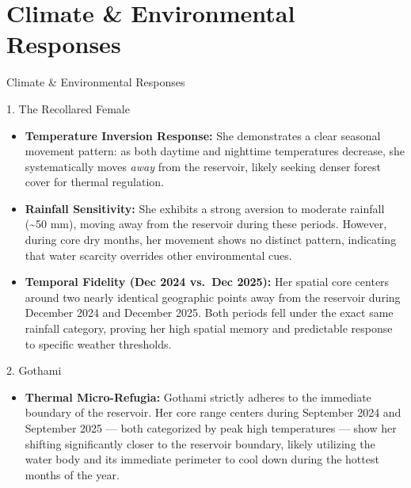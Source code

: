 \documentclass{beamer}
\begin{document}
	
	
	
	\section{Climate \& Environmental Responses}
	\begin{frame}{Climate \& Environmental Responses}
		\begin{block}{1. The Recollared Female}
			\begin{itemize}[label=\textbullet]
				\item \textbf{Temperature Inversion Response:} She demonstrates a clear seasonal movement pattern: as both daytime and nighttime temperatures decrease, she systematically moves \textit{away} from the reservoir, likely seeking denser forest cover for thermal regulation.
				\item \textbf{Rainfall Sensitivity:} She exhibits a strong aversion to moderate rainfall (\textasciitilde 50 mm), moving away from the reservoir during these periods. However, during core dry months, her movement shows no distinct pattern, indicating that water scarcity overrides other environmental cues.
				\item \textbf{Temporal Fidelity (Dec 2024 vs.\ Dec 2025):} Her spatial core centers around two nearly identical geographic points away from the reservoir during December 2024 and December 2025. Both periods fell under the exact same rainfall category, proving her high spatial memory and predictable response to specific weather thresholds.
			\end{itemize}
		\end{block}
	\end{frame}
	
	
	
	
	\begin{frame}
		\begin{block}{2. Gothami}
			\begin{itemize}[label=\textbullet]
				\item \textbf{Thermal Micro-Refugia:} Gothami strictly adheres to the immediate boundary of the reservoir. Her core range centers during September 2024 and September 2025 --- both categorized by peak high temperatures --- show her shifting significantly closer to the reservoir boundary, likely utilizing the water body and its immediate perimeter to cool down during the hottest months of the year.
			\end{itemize}
		\end{block}
	\end{frame}
	
\end{document}

